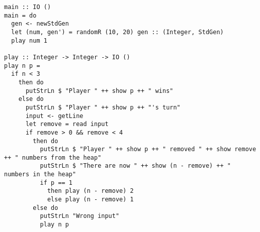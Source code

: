 \documentclass{article}
\begin{document}
\begin{ans}
    \hspace{1em}
    \begin{lstlisting}
main :: IO ()
main = do
  gen <- newStdGen
  let (num, gen') = randomR (10, 20) gen :: (Integer, StdGen)
  play num 1

play :: Integer -> Integer -> IO ()
play n p =
  if n < 3
    then do
      putStrLn $ "Player " ++ show p ++ " wins"
    else do
      putStrLn $ "Player " ++ show p ++ "'s turn"
      input <- getLine
      let remove = read input
      if remove > 0 && remove < 4
        then do
          putStrLn $ "Player " ++ show p ++ " removed " ++ show remove ++ " numbers from the heap"
          putStrLn $ "There are now " ++ show (n - remove) ++ " numbers in the heap"
          if p == 1
            then play (n - remove) 2
            else play (n - remove) 1
        else do
          putStrLn "Wrong input"
          play n p
    \end{lstlisting}
\end{ans}
\end{document}
